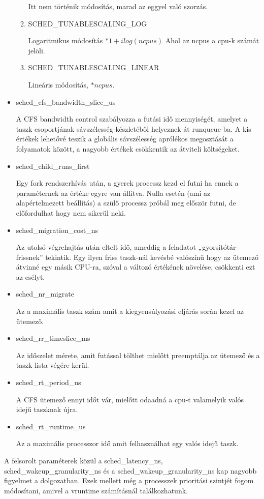 \begin{itemize}
\begin{enumerate}
Itt nem történik módosítás, marad az eggyel való szorzás.
\item SCHED\_TUNABLESCALING\_LOG

Logaritmikus módosítás $*1+ilog(ncpus)$
Ahol az ncpus a cpu-k számát jelöli.

\item SCHED\_TUNABLESCALING\_LINEAR

Lineáris módosítás, $*ncpus$. 
\end{enumerate}

\item sched\_cfs\_bandwidth\_slice\_us

A CFS bandwidth control szabályozza a futási idő mennyiségét, amelyet a taszk csoportjának sávszélesség-készletéből helyeznek át runqueue-ba. A kis értékek lehetővé teszik a globális sávszélesség aprólékos megosztását a folyamatok között, a nagyobb értékek csökkentik az átviteli költségeket.
\item sched\_child\_runs\_first

Egy fork rendszerhívás után, a gyerek processz kezd el futni ha ennek a paraméternek az értéke egyre van állítva. Nulla esetén (ami az alapértelmezett beállítás) a szülő processz próbál meg először futni, de előfordulhat hogy nem sikerül neki.
\item sched\_migration\_cost\_ns

Az utolsó végrehajtás után eltelt idő, ameddig a feladatot „gyorsítótár-frissnek” tekintik.
Egy ilyen friss taszk-nál kevésbé valószínű hogy az ütemező átvinné egy másik CPU-ra, szóval a változó értékének növelése, csökkenti ezt az esélyt.
\item sched\_nr\_migrate

Az a maximális taszk szám amit a kiegyensúlyozási eljárás során kezel az ütemező.
\item sched\_rr\_timeslice\_ms

Az időszelet mérete, amit futással tölthet mielőtt preemptálja az ütemező és a taszk lista végére kerül.
\item sched\_rt\_period\_us

A CFS ütemező ennyi időt vár, mielőtt odaadná a cpu-t valamelyik valós idejű taszknak újra.
\item sched\_rt\_runtime\_us

Az a maximális processzor idő amit felhasználhat egy valós idejű taszk.
\end{itemize}
A felsorolt paraméterek közül a sched\_latency\_ns, sched\_wakeup\_granularity\_ns és a sched\_wakeup\_granularity\_ns kap nagyobb figyelmet a dolgozatban. Ezek mellett még a processzek prioritási szintjét fogom módosítani, amivel a vruntime számításnál találkozhatunk.
